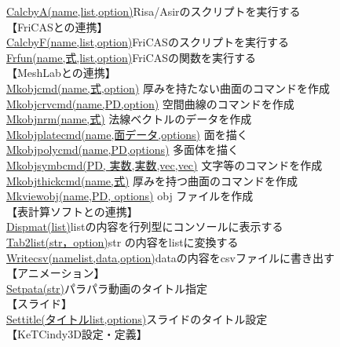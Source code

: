 \documentclass[papersize,a4paper,12pt,uplatex]{jsarticle}
\begin{document}
\begin{tabbing}
\hyperlink{calcbyA}{CalcbyA(name,list,option)}\>Risa/Asirのスクリプトを実行する\\
\vspace{\baselineskip}
【FriCASとの連携】\\
\hyperlink{calcbyF}{CalcbyF(name,list,option)}\>FriCASのスクリプトを実行する\\
\hyperlink{frfun}{Frfun(name,式,list,option)}\>FriCASの関数を実行する\\
\vspace{\baselineskip}
【MeshLabとの連携】\\
\hyperlink{mkobjcmd}{Mkobjcmd(name,式,option)} \>厚みを持たない曲面のコマンドを作成\\
\hyperlink{mkobjcrvcmd}{Mkobjcrvcmd(name,PD,option)} \>空間曲線のコマンドを作成\\
\hyperlink{mkobjnrm}{Mkobjnrm(name,式)} \>法線ベクトルのデータを作成\\
\hyperlink{mkobjplatecmd}{Mkobjplatecmd(name,面データ,options)} \>面を描く\\
\hyperlink{mkobjpolycmd}{Mkobjpolycmd(name,PD,options)} \>多面体を描く\\
\hyperlink{mkobjsymbcmd}{Mkobjsymbcmd(PD, 実数,実数,vec,vec)} \>文字等のコマンドを作成\\
\hyperlink{mkobjthickcmd}{Mkobjthickcmd(name,式)} \>厚みを持つ曲面のコマンドを作成\\
\hyperlink{mkviewobj}{Mkviewobj(name,PD, options)} \>obj ファイルを作成\\
\vspace{\baselineskip}
【表計算ソフトとの連携】\\
\hyperlink{dispmat}{Dispmat(list)}\>listの内容を行列型にコンソールに表示する\\
\hyperlink{tab2list}{Tab2list(str，option)}\>str の内容をlistに変換する\\
\hyperlink{writecsv}{Writecsv(namelist,data,option)}\>dataの内容をcsvファイルに書き出す\\
\vspace{\baselineskip}
【アニメーション】\\
\hyperlink{setpara}{Setpata(str)}\>パラパラ動画のタイトル指定\\
【スライド】\\
\hyperlink{settitle}{Settitle(タイトルlist,options)}\>スライドのタイトル設定\\
【KeTCindy3D設定・定義】\\

\end{tabbing}
\end{document}
